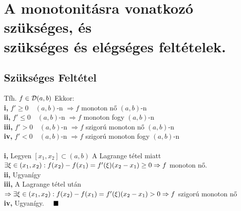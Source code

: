 \documentclass[a4paper,12pt]{article}
\begin{document}
\section{A monotonitásra vonatkozó szükséges, és \\ szükséges és elégséges feltételek.}
\subsection{Szükséges Feltétel}
\tetel Tfh. $f\in \displaystyle\mathcal{D}(a,b)$ Ekkor: \\[0.1cm]\hspace*{0.3cm}\textbf{i,} $f'\geq0\quad(a,b)$-n
$\Rightarrow f$ monoton nő $(a,b)$-n\\[0.1cm]\hspace*{0.3cm}\textbf{ii,}
$f'\leq0\quad(a,b)$-n $\Rightarrow f$ monoton fogy $(a,b)$-n\\[0.1cm]
\hspace*{0.3cm}\textbf{iii,} $f'>0\quad (a,b)$-n $\Rightarrow f$ szigorú monoton nő
$(a,b)$-n\\[0.1cm]\hspace*{0.3cm}\textbf{iv,} $f'<0\quad (a,b)$-n $\Rightarrow f$
szigorú monoton fogy $(a,b)$-n\\[0.2cm]\biz \\[0.1cm]\textbf{i,} Legyen
$[x_1,x_2]\subset(a,b)$ A Lagrange tétel miatt $\exists\xi\in
(x_1,x_2):\\[0.2cm]f(x_2)-f(x_1)=f'(\xi)(x_2-x_1)\geq0\Rightarrow f$ monoton
nő.\\[0.1cm]\textbf{ii,} Ugyanígy\\[0.1cm]\textbf{iii,} A Lagrange tétel után
$\Rightarrow\exists\xi\in (x_1,x_2):\\[0.2cm]f(x_2)-f(x_1)=f'(\xi)(x_2-x_1)>0
\Rightarrow f$ szigorú monoton nő\\[0.1cm]\textbf{iv,} Ugyanígy. $\quad\blacksquare$
\end{document}
